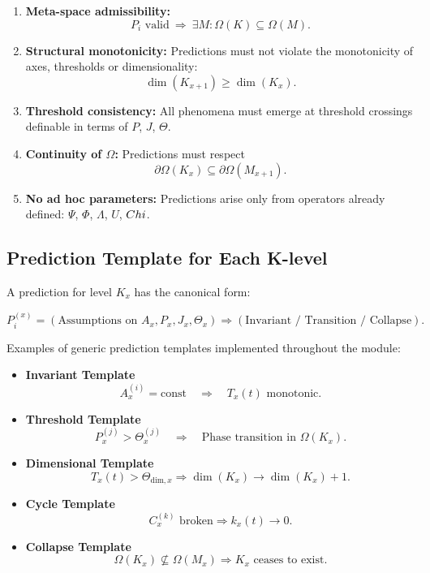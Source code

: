 \begin{enumerate}
    \item \textbf{Meta-space admissibility:}  
    \[
    P_i \text{ valid} \ \Longrightarrow\ \exists M : \Omega(K)\subseteq\Omega(M).
    \]

    \item \textbf{Structural monotonicity:}  
    Predictions must not violate the monotonicity of axes, thresholds or  
    dimensionality:
    \[
    \dim(K_{x+1}) \ge \dim(K_x).
    \]

    \item \textbf{Threshold consistency:}  
    All phenomena must emerge at threshold crossings definable in terms of  
    $P$, $J$, $\Theta$.

    \item \textbf{Continuity of $\Omega$:}  
    Predictions must respect  
    \[
    \partial\Omega(K_x)\subseteq \partial\Omega(M_{x+1}).
    \]

    \item \textbf{No ad hoc parameters:}  
    Predictions arise only from operators already defined:  
    $\Psi$, $\Phi$, $\Lambda$, $U$, $Chi$.
\end{enumerate}

\subsection{Prediction Template for Each K-level}

A prediction for level $K_x$ has the canonical form:

\[
P^{(x)}_i = 
\left(
\text{Assumptions on } A_x, P_x, J_x, \Theta_x
\right)
\Rightarrow
\left(
\text{Invariant / Transition / Collapse}
\right).
\]

Examples of generic prediction templates implemented throughout the module:

\begin{itemize}
    \item \textbf{Invariant Template}
    \[
    A_x^{(i)} = \mathrm{const}
    \quad\Rightarrow\quad
    T_x(t) \text{ monotonic}.
    \]

    \item \textbf{Threshold Template}
    \[
    P_x^{(j)} > \Theta_x^{(j)}
    \quad\Rightarrow\quad
    \text{Phase transition in }\Omega(K_x).
    \]

    \item \textbf{Dimensional Template}
    \[
    T_x(t) > \Theta_{\mathrm{dim},x}
    \Rightarrow
    \dim(K_x)\to\dim(K_x)+1.
    \]

    \item \textbf{Cycle Template}
    \[
    C_x^{(k)} \text{ broken}
    \Rightarrow
    k_x(t)\to 0.
    \]

    \item \textbf{Collapse Template}
    \[
    \Omega(K_x)\not\subseteq\Omega(M_x)
    \Rightarrow
    K_x\text{ ceases to exist}.
    \]
\end{itemize}

